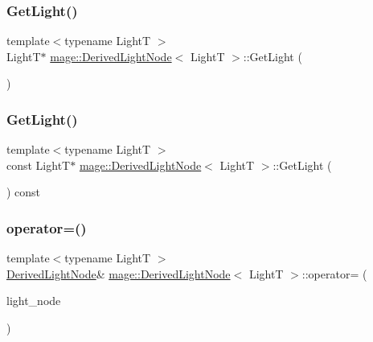 \subsubsection{\texorpdfstring{Get\+Light()}{GetLight()}\hspace{0.1cm}{\footnotesize\ttfamily [1/2]}}
{\footnotesize\ttfamily template$<$typename LightT $>$ \\
LightT$\ast$ \hyperlink{classmage_1_1_derived_light_node}{mage\+::\+Derived\+Light\+Node}$<$ LightT $>$\+::Get\+Light (\begin{DoxyParamCaption}{ }\end{DoxyParamCaption})\hspace{0.3cm}{\ttfamily [noexcept]}}

\hypertarget{classmage_1_1_derived_light_node_a61ace20169a3924d42abc163ebddc19b}{}\label{classmage_1_1_derived_light_node_a61ace20169a3924d42abc163ebddc19b} 
\subsubsection{\texorpdfstring{Get\+Light()}{GetLight()}\hspace{0.1cm}{\footnotesize\ttfamily [2/2]}}
{\footnotesize\ttfamily template$<$typename LightT $>$ \\
const LightT$\ast$ \hyperlink{classmage_1_1_derived_light_node}{mage\+::\+Derived\+Light\+Node}$<$ LightT $>$\+::Get\+Light (\begin{DoxyParamCaption}{ }\end{DoxyParamCaption}) const\hspace{0.3cm}{\ttfamily [noexcept]}}

\hypertarget{classmage_1_1_derived_light_node_ad4a81ae2a671d6c278c74dead4660949}{}\label{classmage_1_1_derived_light_node_ad4a81ae2a671d6c278c74dead4660949} 
\subsubsection{\texorpdfstring{operator=()}{operator=()}\hspace{0.1cm}{\footnotesize\ttfamily [1/2]}}
{\footnotesize\ttfamily template$<$typename LightT $>$ \\
\hyperlink{classmage_1_1_derived_light_node}{Derived\+Light\+Node}\& \hyperlink{classmage_1_1_derived_light_node}{mage\+::\+Derived\+Light\+Node}$<$ LightT $>$\+::operator= (\begin{DoxyParamCaption}\item[{const \hyperlink{classmage_1_1_derived_light_node}{Derived\+Light\+Node}$<$ LightT $>$ \&}]{light\+\_\+node }\end{DoxyParamCaption})\hspace{0.3cm}{\ttfamily [delete]}}

